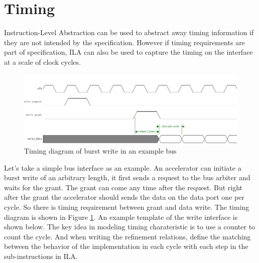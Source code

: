 
\section*{Timing}


Instruction-Level Abstraction can be used to abstract away timing information if they are not intended by the specification. However if timing requirements are part of specification, ILA can also be used to capture the timing on the interface at a scale of clock cycles.

\begin{figure}[h]
\caption{Timing diagram of burst write in an example bus}
\label{fig:timing}
\centering
\includegraphics[width=\textwidth]{images/timing.png}
\end{figure}

Let's take a simple bus interface as an example. An accelerator can initiate a burst write of an arbitrary length, it first sends a request to the bus arbiter and waits for the grant. The grant can come any time after the request. But right after the grant the accelerator should sends the data on the data port one per cycle. So there is timing requirement between grant and data write. The timing diagram is shown in Figure \ref{fig:timing}. An example template of the write interface is shown below. The key idea in modeling timing charateristic is to use a counter to count the cycle. And when writing the refinement relations, define the matching between the behavior of the implementation in each cycle with each step in the sub-instructions in ILA.







